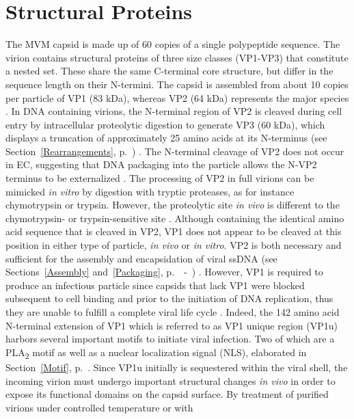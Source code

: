 \clearpage
\section{Structural Proteins}
\label{VPs}

The MVM capsid is made up of 60 copies of a single polypeptide sequence. The virion contains structural proteins of three size classes (VP1-VP3) that constitute a nested set. These share the same C-terminal core structure, but differ in the sequence length on their N-termini. The capsid is assembled from about 10 copies per particle of VP1 (83 kDa), whereas VP2 (64 kDa) represents the major species \cite{pmid988192}. In DNA containing virions, the N-terminal region of VP2 is cleaved during cell entry by intracellular proteolytic digestion to generate VP3 (60 kDa), which displays a truncation of approximately 25 amino acids at its N-terminus (see Section~\ref{Rearrangements}, p.~\pageref{Rearrangements}) \cite{pmid864702, pmid1448928, pmid982825, pmid9770425}. The N-terminal cleavage of VP2 does not occur in EC, suggesting that DNA packaging into the particle allows the N-VP2 terminus to be externalized \cite{pmid3296697, pmid6481856, pmid864702}. The processing of VP2 in full virions can be mimicked \textit{in vitro} by digestion with tryptic proteases, as for instance chymotrypsin or trypsin. However, the proteolytic site \textit{in vivo} is different to the chymotrypsin- or trypsin-sensitive site \cite{pmid6481856, pmid864702, pmid1448928}. Although containing the identical amino acid sequence that is cleaved in VP2, VP1 does not appear to be cleaved at this position in either type of particle, \textit{in vivo} or \textit{in vitro}. VP2 is both necessary and sufficient for the assembly and encapsidation of viral ssDNA (see Sections~\ref{Assembly} and~\ref{Packaging}, p.~\pageref{Assembly}~-~\pageref{Packaging}) \cite{pmid10662625}. However, VP1 is required to produce an infectious particle since capsids that lack VP1 were blocked subsequent to cell binding and prior to the initiation of DNA replication, thus they are unable to fulfill a complete viral life cycle \cite{pmid8416366}. Indeed, the 142 amino acid N-terminal extension of VP1 which is referred to as VP1 unique region (VP1u) harbors several important motifs to initiate viral infection. Two of which are a PLA\textsubscript{2} motif as well as a nuclear localization signal (NLS), elaborated in Section~\ref{Motif}, p.~\pageref{Motif}. Since VP1u initially is sequestered within the viral shell, the incoming virion must undergo important structural changes \textit{in vivo} in order to expose its functional domains on the capsid surface. By treatment of purified virions under controlled temperature or with 